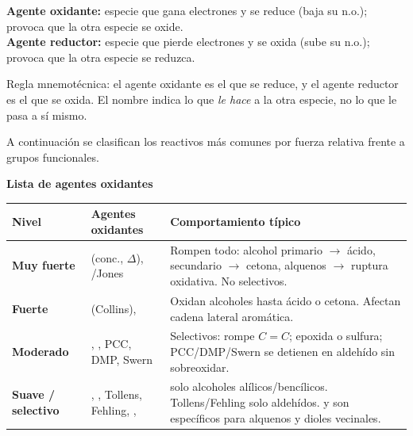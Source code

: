 \textbf{Agente oxidante:} especie que gana electrones y se reduce (baja su n.o.); provoca que la otra especie se oxide. \\
\textbf{Agente reductor:} especie que pierde electrones y se oxida (sube su n.o.); provoca que la otra especie se reduzca. 

\begin{notadidactica}
Regla mnemotécnica: el agente oxidante es el que se reduce, y el agente reductor es el que se oxida. El nombre indica lo que \emph{le hace} a la otra especie, no lo que le pasa a sí mismo.
\end{notadidactica}

A continuación se clasifican los reactivos más comunes por fuerza relativa frente a grupos funcionales.

\textbf{Lista de agentes oxidantes}
\begin{center}
\renewcommand{\arraystretch}{1.5}
\small
\begin{tabular}{L{2.5cm}|L{4.2cm}|L{6.8cm}}
\hline
\textbf{Nivel} & \textbf{Agentes oxidantes} & \textbf{Comportamiento típico} \\
\hline
\textbf{Muy fuerte} & 
 (conc., $\Delta$), /Jones & 
Rompen todo: alcohol primario $\to$ ácido, secundario $\to$ cetona, alquenos $\to$ ruptura oxidativa. No selectivos. \\
\hline
\textbf{Fuerte} & 
 (Collins),  & 
Oxidan alcoholes hasta ácido o cetona. Afectan cadena lateral aromática. \\
\hline
\textbf{Moderado} & 
, , PCC, DMP, Swern & 
Selectivos:  rompe $C{=}C$;  epoxida o sulfura; PCC/DMP/Swern se detienen en aldehído sin sobreoxidar. \\
\hline
\textbf{Suave / selectivo} & 
, , Tollens, Fehling, ,  & 
 solo alcoholes alílicos/bencílicos. Tollens/Fehling solo aldehídos.  y  son específicos para alquenos y dioles vecinales. \\
\hline
\end{tabular}
\normalsize
\end{center}

